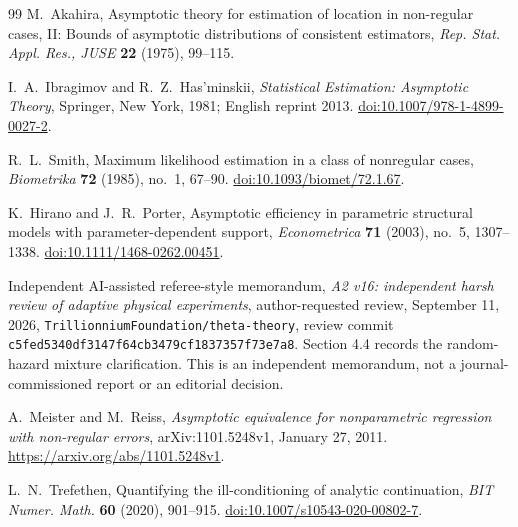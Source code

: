 \begin{thebibliography}{99}
M.~Akahira, Asymptotic theory for estimation of location in non-regular
cases, II: Bounds of asymptotic distributions of consistent estimators,
\emph{Rep. Stat. Appl. Res., JUSE} \textbf{22} (1975), 99--115.

I.~A.~Ibragimov and R.~Z.~Has'minskii,
\emph{Statistical Estimation: Asymptotic Theory},
Springer, New York, 1981; English reprint 2013.
\href{https://doi.org/10.1007/978-1-4899-0027-2}{doi:10.1007/978-1-4899-0027-2}.

R.~L.~Smith, Maximum likelihood estimation in a class of nonregular
cases, \emph{Biometrika} \textbf{72} (1985), no.~1, 67--90.
\href{https://doi.org/10.1093/biomet/72.1.67}{doi:10.1093/biomet/72.1.67}.

K.~Hirano and J.~R.~Porter,
Asymptotic efficiency in parametric structural models with
parameter-dependent support, \emph{Econometrica} \textbf{71} (2003),
no.~5, 1307--1338.
\href{https://doi.org/10.1111/1468-0262.00451}{doi:10.1111/1468-0262.00451}.

Independent AI-assisted referee-style memorandum,
\emph{A2 v16: independent harsh review of adaptive physical experiments},
author-requested review, September 11, 2026,
\texttt{Trillionnium\allowbreak Foundation/\allowbreak theta-theory},
review commit \texttt{c5fed534\allowbreak 0df3147f\allowbreak 64cb3479\allowbreak cf183735\allowbreak 7f73e7a8}.
Section 4.4 records the random-hazard mixture clarification.
This is an independent memorandum, not a journal-commissioned report
or an editorial decision.

A.~Meister and M.~Reiss, \emph{Asymptotic equivalence for nonparametric
regression with non-regular errors}, arXiv:1101.5248v1, January 27, 2011.
\url{https://arxiv.org/abs/1101.5248v1}.

L.~N.~Trefethen, Quantifying the ill-conditioning of analytic continuation,
\emph{BIT Numer. Math.} \textbf{60} (2020), 901--915.
\href{https://doi.org/10.1007/s10543-020-00802-7}{doi:10.1007/s10543-020-00802-7}.

\end{thebibliography}
